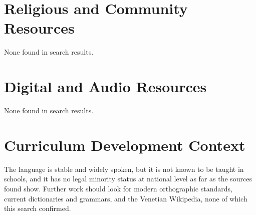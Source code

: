 \documentclass[12pt]{article}
\begin{document}
\section{Religious and Community Resources}
None found in search results.

\section{Digital and Audio Resources}
None found in search results.

\section{Curriculum Development Context}
The language is stable and widely spoken, but it is not known to be taught in schools, and it has no legal minority status at national level as far as the sources found show. Further work should look for modern orthographic standards, current dictionaries and grammars, and the Venetian Wikipedia, none of which this search confirmed.
\end{document}
